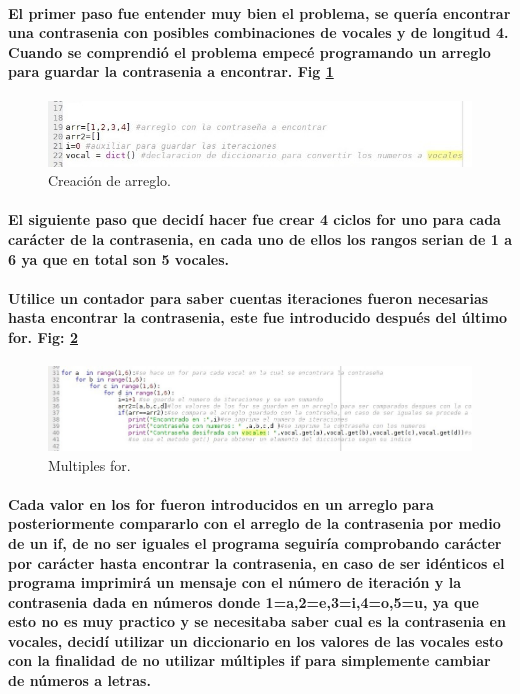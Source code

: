 \documentclass[10pt,a4paper]{article}
\begin{document}
\paragraph{El primer paso fue entender muy bien el problema, se quer\'ia encontrar una contrasenia con posibles combinaciones de vocales y de longitud 4. Cuando se comprendi\'o el problema empec\'e programando un arreglo para guardar la contrasenia a encontrar. Fig \ref{fig:cod1}
}
\begin{figure}[H]
\includegraphics[scale=0.7] {img1.jpg}
\caption{Creaci\'on de arreglo.}
\label{fig:cod1}
\end{figure}

\paragraph{El siguiente paso que decid\'i hacer fue crear 4 ciclos for uno para cada car\'acter de la contrasenia, en cada uno de ellos los rangos serian de 1 a 6 ya que en total son 5 vocales.}

\paragraph{Utilice un contador para saber cuentas iteraciones fueron necesarias hasta encontrar la contrasenia, este fue introducido despu\'es del \'ultimo for. Fig: \ref{fig:cod2}}
\begin{figure}[H]
\includegraphics[scale=0.5] {img2.jpg}
\caption{Multiples for.}
\label{fig:cod2}
\end{figure}
\paragraph{Cada valor en los for fueron introducidos en un arreglo para posteriormente compararlo con el arreglo de la contrasenia por medio de un if, de no ser iguales el programa seguir\'ia comprobando car\'acter por car\'acter hasta encontrar la contrasenia, en caso de ser id\'enticos el programa imprimir\'a un mensaje con  el n\'umero de iteraci\'on y la contrasenia dada en n\'umeros donde 1=a,2=e,3=i,4=o,5=u, ya que esto no es muy practico y se necesitaba saber cual es la contrasenia en vocales, decid\'i utilizar un diccionario en los valores de las vocales esto con la finalidad de no utilizar m\'ultiples if para simplemente cambiar de n\'umeros a letras.}
\end{document}
